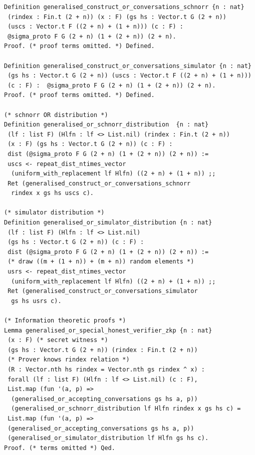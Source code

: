 \documentclass[sigconf,anonymous,review]{acmart}
\begin{document}
\begin{lstlisting}[frame=single, language=Coq, caption={Or-$\Sigma$-Protocol},
label={or_proof},captionpos=t, basicstyle=\ttfamily\footnotesize,
abovecaptionskip=-\medskipamount]
Definition generalised_construct_or_conversations_schnorr {n : nat} 
 (rindex : Fin.t (2 + n)) (x : F) (gs hs : Vector.t G (2 + n))
 (uscs : Vector.t F ((2 + n) + (1 + n))) (c : F) : 
 @sigma_proto F G (2 + n) (1 + (2 + n)) (2 + n).
Proof. (* proof terms omitted. *) Defined.

Definition generalised_construct_or_conversations_simulator {n : nat} 
 (gs hs : Vector.t G (2 + n)) (uscs : Vector.t F ((2 + n) + (1 + n)))  
 (c : F) :  @sigma_proto F G (2 + n) (1 + (2 + n)) (2 + n).
Proof. (* proof terms omitted. *) Defined.

(* schnorr OR distribution *)
Definition generalised_or_schnorr_distribution  {n : nat} 
 (lf : list F) (Hlfn : lf <> List.nil) (rindex : Fin.t (2 + n)) 
 (x : F) (gs hs : Vector.t G (2 + n)) (c : F) : 
 dist (@sigma_proto F G (2 + n) (1 + (2 + n)) (2 + n)) := 
 uscs <- repeat_dist_ntimes_vector 
  (uniform_with_replacement lf Hlfn) ((2 + n) + (1 + n)) ;;
 Ret (generalised_construct_or_conversations_schnorr 
  rindex x gs hs uscs c).

(* simulator distribution *)
Definition generalised_or_simulator_distribution {n : nat} 
 (lf : list F) (Hlfn : lf <> List.nil) 
 (gs hs : Vector.t G (2 + n)) (c : F) : 
 dist (@sigma_proto F G (2 + n) (1 + (2 + n)) (2 + n)) :=
 (* draw ((m + (1 + n)) + (m + n)) random elements *)
 usrs <- repeat_dist_ntimes_vector 
  (uniform_with_replacement lf Hlfn) ((2 + n) + (1 + n)) ;;
 Ret (generalised_construct_or_conversations_simulator 
  gs hs usrs c).

(* Information theoretic proofs *)
Lemma generalised_or_special_honest_verifier_zkp {n : nat}
 (x : F) (* secret witness *)
 (gs hs : Vector.t G (2 + n)) (rindex : Fin.t (2 + n))
 (* Prover knows rindex relation *) 
 (R : Vector.nth hs rindex = Vector.nth gs rindex ^ x) : 
 forall (lf : list F) (Hlfn : lf <> List.nil) (c : F),
 List.map (fun '(a, p) => 
  (generalised_or_accepting_conversations gs hs a, p))
  (generalised_or_schnorr_distribution lf Hlfn rindex x gs hs c) = 
 List.map (fun '(a, p) => 
 (generalised_or_accepting_conversations gs hs a, p))
 (generalised_or_simulator_distribution lf Hlfn gs hs c).
Proof. (* terms omitted *) Qed.

\end{lstlisting}
\end{document}
